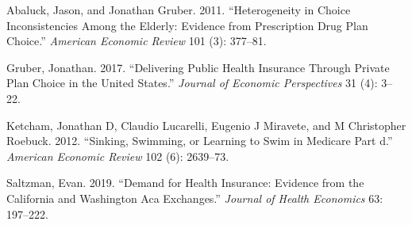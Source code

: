 \documentclass[
  11pt,
]{article}
\newlength{\cslhangindent}
\newenvironment{cslreferences}%
  {\setlength{\parindent}{0pt}%
  \everypar{\setlength{\hangindent}{\cslhangindent}}\ignorespaces}%
  {\par}
\begin{document}
\hypertarget{refs}{}
\begin{cslreferences}
\leavevmode\hypertarget{ref-abaluck2011}{}%
Abaluck, Jason, and Jonathan Gruber. 2011. ``Heterogeneity in Choice Inconsistencies Among the Elderly: Evidence from Prescription Drug Plan Choice.'' \emph{American Economic Review} 101 (3): 377--81.

\leavevmode\hypertarget{ref-gruber2017}{}%
Gruber, Jonathan. 2017. ``Delivering Public Health Insurance Through Private Plan Choice in the United States.'' \emph{Journal of Economic Perspectives} 31 (4): 3--22.

\leavevmode\hypertarget{ref-ketcham2012}{}%
Ketcham, Jonathan D, Claudio Lucarelli, Eugenio J Miravete, and M Christopher Roebuck. 2012. ``Sinking, Swimming, or Learning to Swim in Medicare Part d.'' \emph{American Economic Review} 102 (6): 2639--73.

\leavevmode\hypertarget{ref-saltzman2019}{}%
Saltzman, Evan. 2019. ``Demand for Health Insurance: Evidence from the California and Washington Aca Exchanges.'' \emph{Journal of Health Economics} 63: 197--222.
\end{cslreferences}
\end{document}
